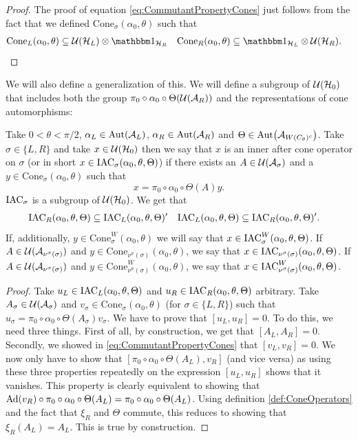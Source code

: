 \documentclass[11pt,a4paper,twoside]{article}
\numberwithin{equation}{section}
\begin{document}
	\begin{proof}
		The proof of equation \eqref{eq:CommutantPropertyCones} just follows from the fact that we defined $\textrm{Cone}_\sigma(\alpha_0,\theta)$ such that
		\begin{align}
			\textrm{Cone}_L(\alpha_0,\theta)&\subseteq \UU(\HH_L)\otimes\id_{\HH_R}&\textrm{Cone}_R(\alpha_0,\theta)&\subseteq \id_{\HH_L} \otimes \UU(\HH_R).
		\end{align}
	\end{proof}
	We will also define a generalization of this. We will define a subgroup of $\mathcal U(\mathcal H_0)$ that includes both the group $\pi_0\circ\alpha_0\circ\Theta(\mathcal U(\mathcal A_R))$ and the representations of cone automorphisms:
	\begin{definition}
		Take $0<\theta<\pi/2$, $\alpha_L\in\Aut{\AA_{L}}$, $\alpha_R\in\Aut{\AA_{R}}$ and $\Theta\in\Aut{\AA_{W(C_\theta)^c}}$. Take $\sigma\in\{L,R\}$ and take $x\in\mathcal U(\mathcal H_0)$ then we say that $x$ is an inner after cone operator on $\sigma$ (or in short $x\in \textrm{IAC}_\sigma(\alpha_0,\theta,\Theta)$) if there exists an $A\in\mathcal U(\mathcal A_\sigma)$ and a $y\in\textrm{Cone}_\sigma(\alpha_0,\theta)$ such that
		\begin{equation}
			x=\pi_0\circ\alpha_0\circ\Theta(A)y.
		\end{equation}
		$\textrm{IAC}_\sigma$ is a subgroup of $\mathcal U(\mathcal H_0)$. We get that
		\begin{align}\label{eq:CommutantProperty}
			\textrm{IAC}_R(\alpha_0,\theta,\Theta)&\subseteq\textrm{IAC}_L(\alpha_0,\theta,\Theta)'&\textrm{IAC}_L(\alpha_0,\theta,\Theta)&\subseteq\textrm{IAC}_R(\alpha_0,\theta,\Theta)'.
		\end{align}
		If, additionally, $y\in \textrm{Cone}_\sigma^W(\alpha_0,\theta)$ we will say that $x\in \textrm{IAC}_\sigma^W(\alpha_0,\theta,\Theta)$. If $A\in\mathcal U(\mathcal A_{\nu^\sigma(\sigma)})$ and $y\in \textrm{Cone}_{\nu^\sigma(\sigma)}(\alpha_0,\theta)$, we say that $x\in\textrm{IAC}_{\nu^\sigma(\sigma)}(\alpha_0,\theta,\Theta)$. If $A\in\mathcal U(\mathcal A_{\nu^\sigma(\sigma)})$ and $y\in \textrm{Cone}_{\nu^\sigma(\sigma)}^W(\alpha_0,\theta)$, we say that $x\in\textrm{IAC}_{\nu^\sigma(\sigma)}^W(\alpha_0,\theta,\Theta)$.
	\end{definition}
	\begin{proof}
		Take $u_L\in\textrm{IAC}_L(\alpha_0,\theta,\Theta)$ and $u_R\in\textrm{IAC}_R(\alpha_0,\theta,\Theta)$ arbitrary. Take $A_\sigma\in\mathcal U(\mathcal A_\sigma)$ and $v_\sigma\in\textrm{Cone}_\sigma(\alpha_0,\theta)$ (for $\sigma\in\{L,R\}$) such that $u_\sigma=\pi_0\circ\alpha_0\circ\Theta(A_\sigma)v_\sigma$. We have to prove that $[u_L,u_R]=0$. To do this, we need three things. First of all, by construction, we get that $[A_L,A_R]=0$. Secondly, we showed in \ref{eq:CommutantPropertyCones} that $[v_L,v_R]=0$. We now only have to show that $[\pi_0\circ\alpha_0\circ\Theta(A_L),v_R]$ (and vice versa) as using these three properties repeatedly on the expression $[u_L,u_R]$ shows that it vanishes. This property is clearly equivalent to showing that $\Ad{v_R}\circ \pi_0\circ\alpha_0\circ\Theta(A_L)=\pi_0\circ\alpha_0\circ\Theta(A_L)$. Using definition \ref{def:ConeOperators} and the fact that $\xi_R$ and $\Theta$ commute, this reduces to showing that $\xi_R(A_L)=A_L$. This is true by construction.
	\end{proof}
\end{document}
